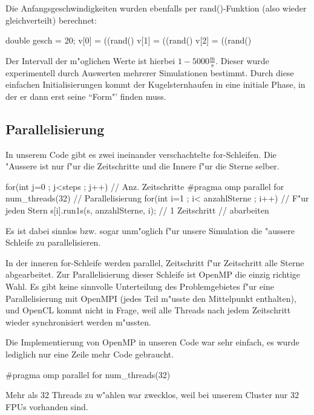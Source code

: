\begin{refsection}
Die Anfangsgeschwindigkeiten wurden ebenfalls per rand()-Funktion (also
wieder gleichverteilt) berechnet:
\begin{Cpp}	
double gesch = 20;
v[0] = ((rand()%
v[1] = ((rand()%
v[2] = ((rand()%
\end{Cpp}
Der Intervall der m"oglichen Werte ist hierbei $\mathrm{1 - 5000
\frac{m}{s}}$. Dieser wurde experimentell durch Auswerten mehrerer
Simulationen bestimmt. Durch diese einfachen Initialisierungen kommt
der Kugelsternhaufen in eine initiale Phase, in der er dann erst seine
``Form"' finden muss.
	
\subsection{Parallelisierung}
In unserem Code gibt es zwei ineinander verschachtelte for-Schleifen. Die
"Aussere ist nur f"ur die Zeitschritte und die Innere f"ur die Sterne
selber.
\begin{Cpp}
for(int j=0 ; j<steps ; j++){              // Anz. Zeitschritte
  #pragma omp parallel for num_threads(32) // Parallelisierung
  for(int i=1 ; i< anzahlSterne ; i++) {   // F"ur jeden Stern
    s[i].run1s(s, anzahlSterne, i);		   // 1 Zeitschritt
  }										   // abarbeiten	
}
\end{Cpp}
Es ist dabei sinnlos bzw. sogar unm"oglich f"ur unsere Simulation die
"aussere Schleife zu parallelisieren.
    
In der inneren for-Schleife werden parallel, Zeitschritt f"ur Zeitschritt
alle Sterne abgearbeitet. Zur Parallelisierung dieser Schleife ist
OpenMP die einzig richtige Wahl. Es gibt keine sinnvolle Unterteilung
des Problemgebietes f"ur eine Parallelisierung mit OpenMPI (jedes Teil
m"usste den Mittelpunkt enthalten), und OpenCL kommt nicht in Frage, weil
alle Threads nach jedem Zeitschritt wieder synchronisiert werden m"ussten.

Die Implementierung von OpenMP in unseren Code war sehr einfach, es
wurde lediglich nur eine Zeile mehr Code gebraucht.
\begin{Cpp}
#pragma omp parallel for num_threads(32)
\end{Cpp}
Mehr als 32 Threads zu w"ahlen war zwecklos, weil bei unserem Cluster
nur 32 FPUs vorhanden sind.
    

\end{refsection}
